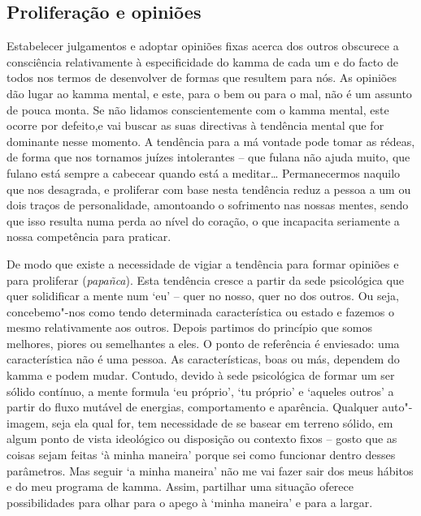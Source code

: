 \subsection{Proliferação e opiniões}

Estabelecer julgamentos e adoptar opiniões fixas acerca dos outros obscurece a
consciência relativamente à especificidade do kamma de cada um e do facto de
todos nos termos de desenvolver de formas que resultem para nós. As opiniões dão
lugar ao kamma mental, e este, para o bem ou para o mal, não é um assunto de
pouca monta. Se não lidamos conscientemente com o kamma mental, este ocorre por
defeito,e vai buscar as suas directivas à tendência mental que for dominante
nesse momento. A tendência para a má vontade pode tomar as rédeas, de forma que
nos tornamos juízes intolerantes -- que fulana não ajuda muito, que fulano está
sempre a cabecear quando está a meditar\ldots{} Permanecermos naquilo que nos
desagrada, e proliferar com base nesta tendência reduz a pessoa a um ou dois
traços de personalidade, amontoando o sofrimento nas nossas mentes, sendo que
isso resulta numa perda ao nível do coração, o que incapacita seriamente a nossa
competência para praticar.

De modo que existe a necessidade de vigiar a tendência para formar opiniões e
para proliferar (\emph{papañca}).
Esta tendência cresce a partir da sede psicológica que quer solidificar a mente
num `eu' -- quer no nosso, quer no dos outros. Ou seja, concebemo"-nos como
tendo determinada característica ou estado e fazemos o mesmo relativamente aos
outros. Depois partimos do princípio que somos melhores, piores ou semelhantes a
eles. O ponto de referência é enviesado: uma característica não é uma pessoa. As
características, boas ou más, dependem do kamma e podem mudar. Contudo, devido à
sede psicológica de formar um ser sólido contínuo, a mente formula `eu próprio',
`tu próprio' e `aqueles outros' a partir do fluxo mutável de energias,
comportamento e aparência. Qualquer auto"-imagem, seja ela qual for, tem
necessidade de se basear em terreno sólido, em algum ponto de vista ideológico
ou disposição ou contexto fixos -- gosto que as coisas sejam feitas `à minha
maneira' porque sei como funcionar dentro desses parâmetros. Mas seguir `a minha
maneira' não me vai fazer sair dos meus hábitos e do meu programa de kamma.
Assim, partilhar uma situação oferece possibilidades para olhar para o apego à
`minha maneira' e para a largar.

